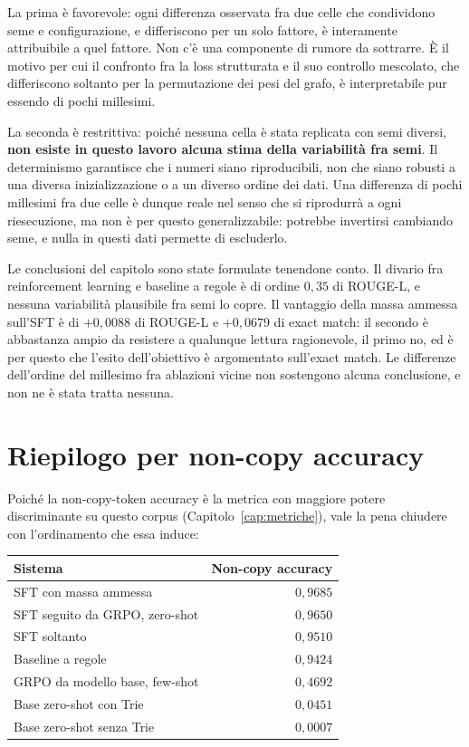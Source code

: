 La prima è favorevole: ogni differenza osservata fra due celle che condividono
seme e configurazione, e differiscono per un solo fattore, è interamente
attribuibile a quel fattore. Non c'è una componente di rumore da sottrarre. È il
motivo per cui il confronto fra la loss strutturata e il suo controllo
mescolato, che differiscono soltanto per la permutazione dei pesi del grafo, è
interpretabile pur essendo di pochi millesimi.

La seconda è restrittiva: poiché nessuna cella è stata replicata con semi
diversi, \textbf{non esiste in questo lavoro alcuna stima della variabilità fra
semi}. Il determinismo garantisce che i numeri siano riproducibili, non che
siano robusti a una diversa inizializzazione o a un diverso ordine dei dati. Una
differenza di pochi millesimi fra due celle è dunque reale nel senso che si
riprodurrà a ogni riesecuzione, ma non è per questo generalizzabile: potrebbe
invertirsi cambiando seme, e nulla in questi dati permette di escluderlo.

Le conclusioni del capitolo sono state formulate tenendone conto. Il divario fra
reinforcement learning e baseline a regole è di ordine $0{,}35$ di ROUGE-L, e
nessuna variabilità plausibile fra semi lo copre. Il vantaggio della massa
ammessa sull'SFT è di $+0{,}0088$ di ROUGE-L e $+0{,}0679$ di exact match: il
secondo è abbastanza ampio da resistere a qualunque lettura ragionevole, il
primo no, ed è per questo che l'esito dell'obiettivo è argomentato sull'exact
match. Le differenze dell'ordine del millesimo fra ablazioni vicine non
sostengono alcuna conclusione, e non ne è stata tratta nessuna.

\section{Riepilogo per non-copy accuracy}

Poiché la non-copy-token accuracy è la metrica con maggiore potere discriminante
su questo corpus (Capitolo~\ref{cap:metriche}), vale la pena chiudere con
l'ordinamento che essa induce:

\begin{center}
\begin{tabular}{lr}
\toprule
Sistema & Non-copy accuracy \\
\midrule
SFT con massa ammessa & $0{,}9685$ \\
SFT seguito da GRPO, zero-shot & $0{,}9650$ \\
SFT soltanto & $0{,}9510$ \\
Baseline a regole & $0{,}9424$ \\
GRPO da modello base, few-shot & $0{,}4692$ \\
Base zero-shot con Trie & $0{,}0451$ \\
Base zero-shot senza Trie & $0{,}0007$ \\
\bottomrule
\end{tabular}
\end{center}

